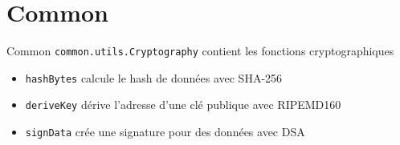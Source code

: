 \documentclass{beamer}
\begin{document}
\section{Common}
\begin{frame}{Common}
	\texttt{common.utils.Cryptography} contient les fonctions cryptographiques
    \begin{itemize}
    	\item \texttt{hashBytes} calcule le hash de données avec SHA-256
        \item \texttt{deriveKey} dérive l'adresse d'une clé publique avec RIPEMD160
        \item \texttt{signData} crée une signature pour des données avec DSA
    \end{itemize}
\end{frame}
\end{document}
